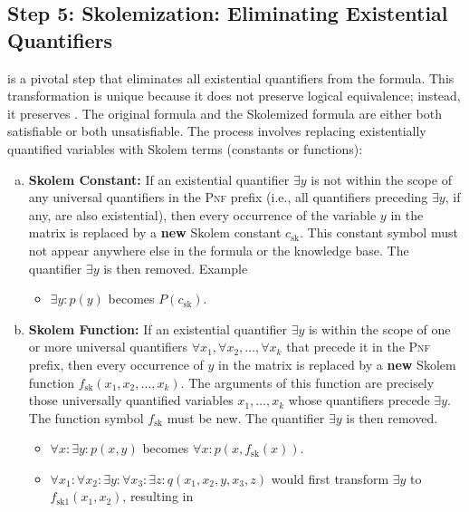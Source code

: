 \subsection{Step 5: Skolemization: Eliminating Existential Quantifiers}
 is a pivotal step that eliminates all existential quantifiers from the formula. This
transformation is unique because it does not preserve logical equivalence; instead, it preserves
. The original formula and the Skolemized formula are either both satisfiable or
both unsatisfiable. 
The process involves replacing existentially quantified variables with Skolem terms (constants or functions):
\begin{enumerate}[(a)]
\item \textbf{Skolem Constant:} If an existential quantifier $\exists y$ is not within the scope of any
      universal quantifiers in the \textsc{Pnf} prefix (i.e., all quantifiers preceding $\exists y$, if any, are
      also existential), then every occurrence of the variable $y$ in the matrix is replaced by a \textbf{new}
      Skolem constant $c_{\mathrm{sk}}$. This constant symbol must not appear anywhere else in the formula or the
      knowledge base. The quantifier $\exists y$ is then removed.  Example
      \begin{itemize}
          \item $\exists y: p(y)$ becomes $P(c_{\mathrm{sk}})$.
      \end{itemize}
\item \textbf{Skolem Function:} If an existential quantifier $\exists y$ is within the scope of one or more
      universal quantifiers $\forall x_1, \forall x_2, \dots, \forall x_k$ that precede it in the \textsc{Pnf}
      prefix, then every occurrence of $y$ in the matrix is replaced by a \textbf{new} Skolem function
      $f_{\mathrm{sk}}(x_1, x_2, \dots, x_k)$. The arguments of this function are precisely those universally
      quantified variables $x_1, \dots, x_k$ whose quantifiers precede $\exists y$. The function symbol
      $f_{\mathrm{sk}}$ must be new. The quantifier $\exists y$ is then removed. 
      \begin{itemize}
        \item $\forall x: \exists y: p(x,y)$ becomes $\forall x: p(x, f_{\mathrm{sk}}(x))$.
        \item  $\forall x_1: \forall x_2: \exists y: \forall x_3: \exists z: q(x_1, x_2, y, x_3, z)$ would first
              transform $\exists y$ to $f_{\mathrm{sk1}}(x_1, x_2)$, resulting in

\end{itemize}
\end{enumerate}
